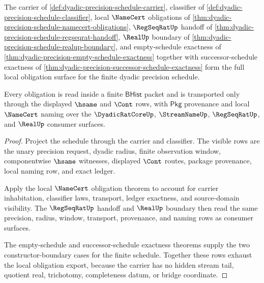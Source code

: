 \begin{theorem}
\label{thm:dyadicprecision-schedule-obligation-export}
The carrier of \autoref{def:dyadic-precision-schedule-carrier}, classifier of
\autoref{def:dyadic-precision-schedule-classifier}, local $\NameCert$
obligations of
\autoref{thm:dyadic-precision-schedule-namecert-obligations}, $\RegSeqRatUp$
handoff of \autoref{thm:dyadic-precision-schedule-regseqrat-handoff},
$\RealUp$ boundary of
\autoref{thm:dyadic-precision-schedule-realup-boundary}, and empty-schedule
exactness of \autoref{thm:dyadic-precision-empty-schedule-exactness} together
with successor-schedule exactness of
\autoref{thm:dyadic-precision-successor-schedule-exactness} form the full local
obligation surface for the finite dyadic precision schedule.

Every obligation is read inside a finite $\mathsf{BHist}$ packet and is
transported only through the displayed $\hsame$ and $\Cont$ rows, with
$\mathsf{Pkg}$ provenance and local $\NameCert$ naming over the
$\DyadicRatCoreUp$, $\StreamNameUp$, $\RegSeqRatUp$, and $\RealUp$ consumer
surfaces.
\end{theorem}
\begin{proof}
Project the schedule through the carrier and classifier. The visible rows are
the unary precision request, dyadic radius, finite observation window,
componentwise $\hsame$ witnesses, displayed $\Cont$ routes, package provenance,
local naming row, and exact ledger.

Apply the local $\NameCert$ obligation theorem to account for carrier
inhabitation, classifier laws, transport, ledger exactness, and source-domain
visibility. The $\RegSeqRatUp$ handoff and $\RealUp$ boundary then read the same
precision, radius, window, transport, provenance, and naming rows as consumer
surfaces.

The empty-schedule and successor-schedule exactness theorems supply the two
constructor-boundary cases for the finite schedule. Together these rows exhaust
the local obligation export, because the carrier has no hidden stream tail,
quotient real, trichotomy, completeness datum, or bridge coordinate.
\end{proof}

